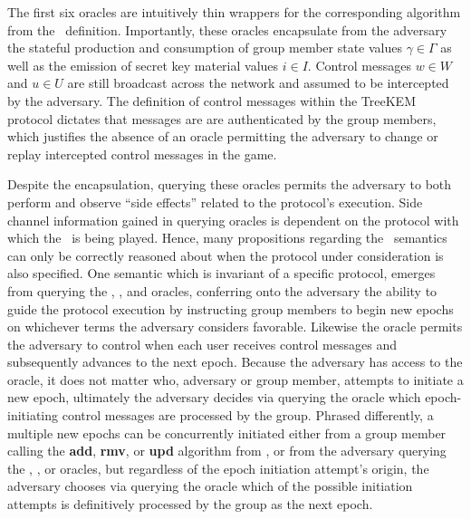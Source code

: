 The first six oracles are intuitively thin wrappers for the corresponding algorithm from the \CGKAdef\ definition.
Importantly, these oracles encapsulate from the adversary the stateful production and consumption of group member state values \(\gamma \in \Gamma\) as well as the emission of secret key material values \(i \in I\).
Control messages \(w \in W\) and \(u \in U\) are still broadcast across the network and assumed to be intercepted by the adversary.
The definition of control messages within the TreeKEM protocol dictates that messages are are authenticated by the group members, which justifies the absence of an oracle permitting the adversary to change or replay intercepted control messages in the  game.

Despite the encapsulation, querying these oracles permits the adversary to both perform and observe ``side effects'' related to the protocol's execution.
Side channel information gained in querying oracles is dependent on the protocol with which the \CGKAsec\ is being played.
Hence, many propositions regarding the \CGKAsec\ semantics can only be correctly reasoned about when the protocol under consideration is also specified.
One semantic which is invariant of a specific protocol, emerges from querying the , , and  oracles, conferring onto the adversary the ability to guide the protocol execution by instructing group members to begin new epochs on whichever terms the adversary considers favorable.
Likewise the  oracle permits the adversary to control when each user receives control messages and subsequently advances to the next epoch.
Because the adversary has access to the  oracle, it does not matter who, adversary or group member, attempts to initiate a new epoch, ultimately the adversary decides via querying the  oracle which epoch-initiating control messages are processed by the group.
Phrased differently, a multiple new epochs can be concurrently initiated either from a group member calling the \textbf{add}, \textbf{rmv}, or \textbf{upd} algorithm from \CGKAdef, or from the adversary querying the , , or  oracles, but regardless of the epoch initiation attempt's origin, the adversary chooses via querying the  oracle which of the possible initiation attempts is definitively processed by the group as the next epoch.

